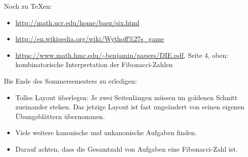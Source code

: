 \documentclass[a4paper,ngerman]{scrartcl}
\begin{document}
\vfill

Noch zu \TeX{}en:
\begin{itemize}
\item \url{http://math.ucr.edu/home/baez/six.html}
\item \url{http://en.wikipedia.org/wiki/Wythoff%27s_game}
\item \url{https://www.math.hmc.edu/~benjamin/papers/DIE.pdf}, Seite 4, oben:
kombinatorische Interpretation der Fibonacci-Zahlen
\end{itemize}

Bis Ende des Sommersemesters zu erledigen:
\begin{itemize}
\item Tolles Layout überlegen: Je zwei Seitenlängen müssen im goldenen Schnitt
zueinander stehen. Das jetzige Layout ist fast ungeändert von seinen eigenen
Übungsblättern übernommen.
\item Viele weitere kanonische und unkanonische Aufgaben finden.
\item Darauf achten, dass die Gesamtzahl von Aufgaben eine Fibonacci-Zahl ist.
\end{itemize}
\end{document}
